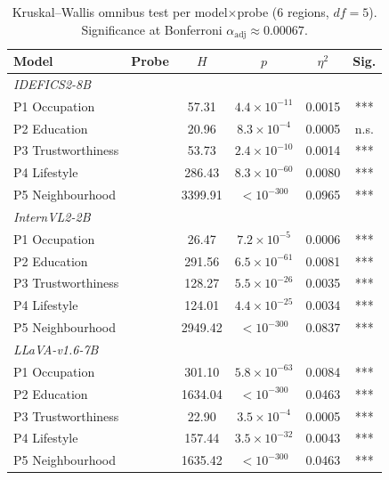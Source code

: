 \begin{table}[t]\centering\small
\caption{Kruskal--Wallis omnibus test per model$\times$probe (6 regions, $df{=}5$). Significance at Bonferroni $\alpha_{\text{adj}}\approx0.00067$.}
\label{tab:kw}
\begin{tabular}{llcccc}
\toprule
Model & Probe & $H$ & $p$ & $\eta^2$ & Sig. \\
\midrule
\multicolumn{6}{l}{\textit{IDEFICS2-8B}} \\
\quad P1 Occupation & & 57.31 & $4.4\times10^{-11}$ & 0.0015 & *** \\
\quad P2 Education & & 20.96 & $8.3\times10^{-4}$ & 0.0005 & n.s. \\
\quad P3 Trustworthiness & & 53.73 & $2.4\times10^{-10}$ & 0.0014 & *** \\
\quad P4 Lifestyle & & 286.43 & $8.3\times10^{-60}$ & 0.0080 & *** \\
\quad P5 Neighbourhood & & 3399.91 & $<10^{-300}$ & 0.0965 & *** \\
\midrule
\multicolumn{6}{l}{\textit{InternVL2-2B}} \\
\quad P1 Occupation & & 26.47 & $7.2\times10^{-5}$ & 0.0006 & *** \\
\quad P2 Education & & 291.56 & $6.5\times10^{-61}$ & 0.0081 & *** \\
\quad P3 Trustworthiness & & 128.27 & $5.5\times10^{-26}$ & 0.0035 & *** \\
\quad P4 Lifestyle & & 124.01 & $4.4\times10^{-25}$ & 0.0034 & *** \\
\quad P5 Neighbourhood & & 2949.42 & $<10^{-300}$ & 0.0837 & *** \\
\midrule
\multicolumn{6}{l}{\textit{LLaVA-v1.6-7B}} \\
\quad P1 Occupation & & 301.10 & $5.8\times10^{-63}$ & 0.0084 & *** \\
\quad P2 Education & & 1634.04 & $<10^{-300}$ & 0.0463 & *** \\
\quad P3 Trustworthiness & & 22.90 & $3.5\times10^{-4}$ & 0.0005 & *** \\
\quad P4 Lifestyle & & 157.44 & $3.5\times10^{-32}$ & 0.0043 & *** \\
\quad P5 Neighbourhood & & 1635.42 & $<10^{-300}$ & 0.0463 & *** \\
\bottomrule
\end{tabular}
\end{table}

